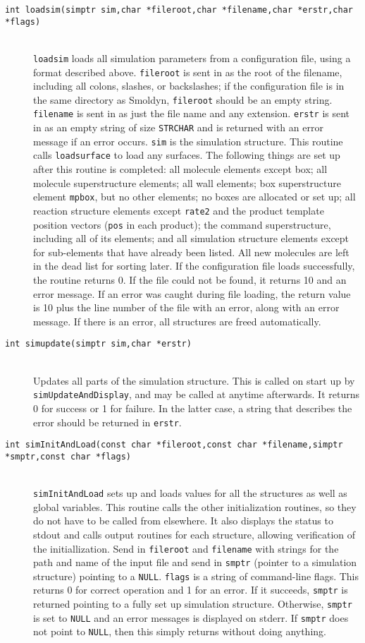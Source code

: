 \documentclass {scrbook}
\newcommand {\ttt} {\texttt}
\begin{document}
\begin{description}
\item[\ttt{int loadsim(simptr sim,char *fileroot,char *filename,char *erstr,char *flags)}]
\hfill \\
\ttt{loadsim} loads all simulation parameters from a configuration file, using a format described above. \ttt{fileroot} is sent in as the root of the filename, including all colons, slashes, or backslashes; if the configuration file is in the same directory as Smoldyn, \ttt{fileroot} should be an empty string. \ttt{filename} is sent in as just the file name and any extension. \ttt{erstr} is sent in as an empty string of size \ttt{STRCHAR} and is returned with an error message if an error occurs. \ttt{sim} is the simulation structure. This routine calls \ttt{loadsurface} to load any surfaces. The following things are set up after this routine is completed: all molecule elements except box; all molecule superstructure elements; all wall elements; box superstructure element \ttt{mpbox}, but no other elements; no boxes are allocated or set up; all reaction structure elements except \ttt{rate2} and the product template position vectors (\ttt{pos} in each product); the command superstructure, including all of its elements; and all simulation structure elements except for sub-elements that have already been listed. All new molecules are left in the dead list for sorting later. If the configuration file loads successfully, the routine returns 0. If the file could not be found, it returns 10 and an error message. If an error was caught during file loading, the return value is 10 plus the line number of the file with an error, along with an error message. If there is an error, all structures are freed automatically.

\item[\ttt{int simupdate(simptr sim,char *erstr)}]
\hfill \\
Updates all parts of the simulation structure. This is called on start up by \ttt{simUpdateAndDisplay}, and may be called at anytime afterwards. It returns 0 for success or 1 for failure. In the latter case, a string that describes the error should be returned in \ttt{erstr}.

\item[\ttt{int simInitAndLoad(const char *fileroot,const char *filename,simptr *smptr,const char *flags)}]
\hfill \\
\ttt{simInitAndLoad} sets up and loads values for all the structures as well as global variables. This routine calls the other initialization routines, so they do not have to be called from elsewhere. It also displays the status to stdout and calls output routines for each structure, allowing verification of the initiallization. Send in \ttt{fileroot} and \ttt{filename} with strings for the path and name of the input file and send in \ttt{smptr} (pointer to a simulation structure) pointing to a \ttt{NULL}. \ttt{flags} is a string of command-line flags. This returns 0 for correct operation and 1 for an error. If it succeeds, \ttt{smptr} is returned pointing to a fully set up simulation structure. Otherwise, \ttt{smptr} is set to \ttt{NULL} and an error messages is displayed on stderr. If \ttt{smptr} does not point to \ttt{NULL}, then this simply returns without doing anything.


\end{description}
\end{document}

